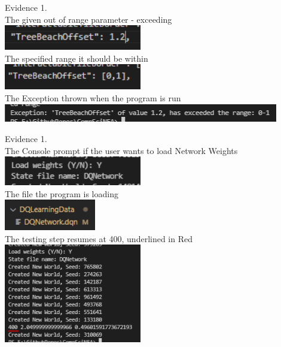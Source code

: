 \begin{center}
    {\large Evidence 1.\rn }\\ 
    \vspace{0.3cm}
    The given out of range parameter - exceeding \\
    \includegraphics[width=6cm]{Images/Testing/T1.4.1.PNG} \\
    The specified range it should be within \\
    \includegraphics[width=6cm]{Images/Testing/T1.4.2.PNG} \\
    The Exception thrown when the program is run \\
    \includegraphics[width=12cm]{Images/Testing/T1.4.3.PNG} \\
    \vspace{1cm}

    {\large Evidence 1.\rn }\\ 
    \vspace{0.3cm}
    The Console prompt if the user wants to load Network Weights \\
    \includegraphics[width=6cm]{Images/Testing/T1.5.1.PNG} \\
    The file the program is loading \\
    \includegraphics[width=4cm]{Images/Testing/T1.5.2.PNG} \\
    The testing step resumes at 400, underlined in Red \\
    \includegraphics[width=6cm]{Images/Testing/T1.5.3.PNG}
    \vspace{1cm}


\end{center}
